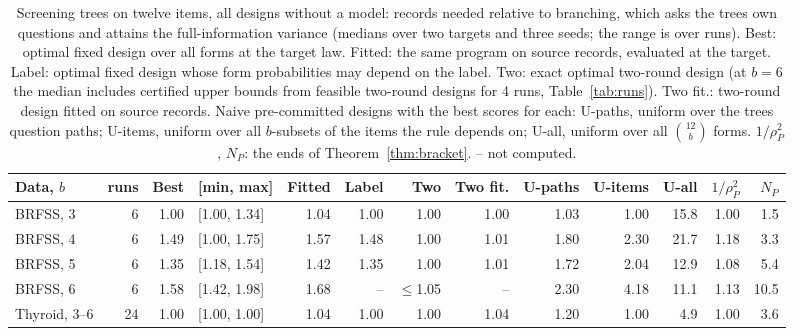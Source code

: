 \begin{table}[h]
\centering
\caption{Screening trees on twelve items, all designs without a model: records needed relative to branching, which asks the tree\textquotesingle s own questions and attains the full-information variance (medians over two targets and three seeds; the range is over runs). Best: optimal fixed design over all forms at the target law. Fitted: the same program on source records, evaluated at the target. Label: optimal fixed design whose form probabilities may depend on the label. Two: exact optimal two-round design (at $b=6$ the median includes certified upper bounds from feasible two-round designs for 4 runs, Table~\ref{tab:runs}). Two fit.: two-round design fitted on source records. Naive pre-committed designs with the best scores for each: U-paths, uniform over the tree\textquotesingle s question paths; U-items, uniform over all $b$-subsets of the items the rule depends on; U-all, uniform over all $\binom{12}b$ forms. $1/\rho_P^2$, $N_P$: the ends of Theorem~\ref{thm:bracket}. -- not computed.}
\label{tab:screeningfull}
\footnotesize
\setlength{\tabcolsep}{4.6pt}
\begin{tabular}{lrrlrrrrrrrrr}
\toprule
Data, $b$ & runs & Best & [min, max] & Fitted & Label & Two & Two fit. & U-paths & U-items & U-all & $1/\rho_P^2$ & $N_P$ \\
\midrule
BRFSS, 3 & 6 & 1.00 & [1.00, 1.34] & 1.04 & 1.00 & 1.00 & 1.00 & 1.03 & 1.00 & 15.8 & 1.00 & 1.5 \\
BRFSS, 4 & 6 & 1.49 & [1.00, 1.75] & 1.57 & 1.48 & 1.00 & 1.01 & 1.80 & 2.30 & 21.7 & 1.18 & 3.3 \\
BRFSS, 5 & 6 & 1.35 & [1.18, 1.54] & 1.42 & 1.35 & 1.00 & 1.01 & 1.72 & 2.04 & 12.9 & 1.08 & 5.4 \\
BRFSS, 6 & 6 & 1.58 & [1.42, 1.98] & 1.68 & -- & $\le$1.05 & -- & 2.30 & 4.18 & 11.1 & 1.13 & 10.5 \\
Thyroid, 3--6 & 24 & 1.00 & [1.00, 1.00] & 1.04 & 1.00 & 1.00 & 1.04 & 1.20 & 1.00 & 4.9 & 1.00 & 3.6 \\
\bottomrule
\end{tabular}
\end{table}
